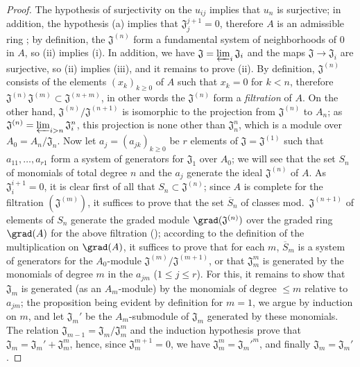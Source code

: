\begin{proof}
\label{proof-0.7.2.7}
The hypothesis of surjectivity on the $u_{ij}$ implies that $u_n$ is surjective;
in addition, the hypothesis (a) implies that $\mathfrak{J}_j^{j+1}=0$, therefore
$A$ is an admissible ring ; by definition, the
$\mathfrak{J}^{(n)}$ form a fundamental system of neighborhoods of $0$ in $A$,
so (ii) implies (i). In addition, we have
$\mathfrak{J}=\varprojlim_i\mathfrak{J}_i$ and the maps
$\mathfrak{J}\to\mathfrak{J}_i$ are surjective, so (ii) implies (iii), and it
remains to prove (ii). By definition, $\mathfrak{J}^{(n)}$ consists of the
elements $(x_k)_{k\geq 0}$ of $A$ such that $x_k=0$ for $k<n$, therefore
$\mathfrak{J}^{(n)}\mathfrak{J}^{(m)}\subset\mathfrak{J}^{(n+m)}$, in other
words the $\mathfrak{J}^{(n)}$ form a \emph{filtration} of $A$. On the other
hand, $\mathfrak{J}^{(n)}/\mathfrak{J}^{(n+1)}$ is isomorphic to the projection
from $\mathfrak{J}^{(n)}$ to $A_n$; as
$\mathfrak{J}^{(n)}=\varprojlim_{i>n}\mathfrak{J}_i^n$, this projection is none
other than $\mathfrak{J}_n^n$, which is a module over $A_0=A_n/\mathfrak{J}_n$.
Now let $a_j=(a_{jk})_{k\geq 0}$ be $r$ elements of
$\mathfrak{J}=\mathfrak{J}^{(1)}$ such that $a_{11},\dots,a_{r1}$ form a system
of generators for $\mathfrak{J}_1$ over $A_0$; we will see that the set $S_n$ of
monomials of total degree $n$ and the $a_j$ generate the ideal
$\mathfrak{J}^{(n)}$ of $A$. As $\mathfrak{J}_i^{i+1}=0$, it is clear first of
all that $S_n\subset\mathfrak{J}^{(n)}$; since $A$ is complete for the
filtration $(\mathfrak{J}^{(m)})$, it suffices to prove that the set
$\overline{S}_n$ of classes mod.~$\mathfrak{J}^{(n+1)}$ of elements of $S_n$
generate the graded module $\grad(\mathfrak{J}^{(n)})$ over the graded ring
$\grad(A)$ for the above filtration (\cite[p.~18--06, lemme]{I-1}); according to
the definition of the multiplication on $\grad(A)$,
it suffices to prove that for each $m$, $\overline{S}_m$ is a system of
generators for the $A_0$-module $\mathfrak{J}^{(m)}/\mathfrak{J}^{(m+1)}$, or
that $\mathfrak{J}_m^m$ is generated by the monomials of degree $m$ in the
$a_{jm}$ ($1\leq j\leq r$). For this, it remains to show that
$\mathfrak{J}_m$ is generated (as an $A_m$-module) by the monomials of degree
$\leq m$ relative to $a_{jm}$; the proposition being evident by definition
for $m=1$, we argue by induction on $m$, and let $\mathfrak{J}_m'$ be the
$A_m$-submodule of $\mathfrak{J}_m$ generated by these monomials. The relation
$\mathfrak{J}_{m-1}=\mathfrak{J}_m/\mathfrak{J}_m^m$ and the induction
hypothesis prove that $\mathfrak{J}_m=\mathfrak{J}_m'+\mathfrak{J}_m^m$, hence,
since $\mathfrak{J}_m^{m+1}=0$, we have $\mathfrak{J}_m^m={\mathfrak{J}_m'}^m$,
and finally $\mathfrak{J}_m=\mathfrak{J}_m'$.
\end{proof}

